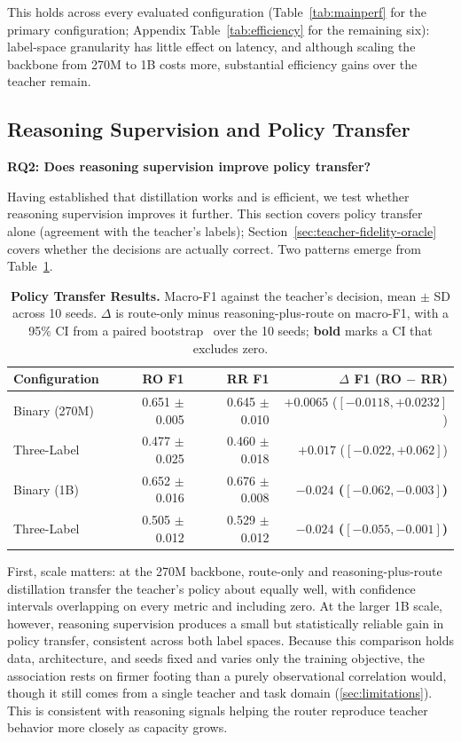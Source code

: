 \documentclass{article}
\begin{document}
This holds across every evaluated configuration (Table~\ref{tab:mainperf}
for the primary configuration; Appendix Table~\ref{tab:efficiency}
for the remaining six): label-space granularity has little effect on
latency, and although scaling the backbone from 270M to 1B costs more,
substantial efficiency gains over the teacher remain.
\subsection{Reasoning Supervision and Policy Transfer}
\label{sec:main-result}
\textbf{RQ2: Does reasoning supervision improve policy transfer?}

Having established that distillation works and is efficient, we test
whether reasoning supervision improves it further. This section covers
policy transfer alone (agreement with the teacher's labels);
Section~\ref{sec:teacher-fidelity-oracle} covers whether the decisions
are actually correct. Two patterns emerge from Table~\ref{tab:main270m}.


\begin{table}[h]
\centering
\caption{\textbf{Policy Transfer Results.}
Macro-F1 against the teacher's decision, mean $\pm$ SD
across 10 seeds. $\Delta$ is route-only minus reasoning-plus-route on
macro-F1, with a 95\% CI from a paired bootstrap~\citep{koehn2004statistical} over the 10 seeds;
\textbf{bold} marks a CI that excludes zero.}
\label{tab:main270m}
\small
\begin{tabular}{@{}lrrr@{}}
\toprule
Configuration & RO F1 & RR F1 & $\Delta$ F1 (RO $-$ RR) \\
\midrule
Binary (270M)& 0.651 $\pm$ 0.005 & 0.645 $\pm$ 0.010 & $+0.0065$ ($[-0.0118, +0.0232]$) \\
Three-Label  & 0.477 $\pm$ 0.025 & 0.460 $\pm$ 0.018 & $+0.017$ ($[-0.022, +0.062]$) \\

\midrule

Binary (1B) & 0.652 $\pm$ 0.016 & 0.676 $\pm$ 0.008 & \textbf{$-0.024$ ($[-0.062, -0.003]$)} \\
Three-Label & 0.505 $\pm$ 0.012 & 0.529 $\pm$ 0.012 & \textbf{$-0.024$ ($[-0.055, -0.001]$)} \\
\bottomrule
\end{tabular}
\end{table}

First, scale matters: at the 270M backbone, route-only and
reasoning-plus-route distillation transfer the teacher's policy about
equally well, with confidence intervals overlapping on every metric
and including zero. At the larger 1B scale, however, reasoning
supervision produces a small but statistically reliable gain in policy
transfer, consistent across both label spaces. Because this comparison
holds data, architecture, and seeds fixed and varies only the training
objective, the association rests on firmer footing than a purely
observational correlation would, though it still comes from a single
teacher and task domain (\ref{sec:limitations}). This is consistent
with reasoning signals helping the router reproduce teacher behavior
more closely as capacity grows.
\end{document}
